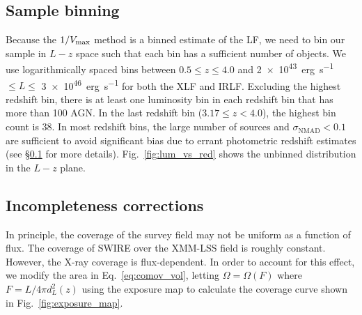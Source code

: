 \documentclass[twocolumn, trackchanges]{aastex63}
\begin{document}
\subsection{Sample binning}
\label{sec:binning}

Because the $1/V_{\rm max}$ method is a binned estimate of the LF, we need to bin our sample in $L-z$ space such that each bin has a sufficient number of objects.
We use logarithmically spaced bins between $0.5 \leq z \leq 4.0$ and \SI{2e43}{erg~s^{-1}} $\leq L \leq$ \SI{3e46}{erg~s^{-1}} for both the XLF and IRLF.
Excluding the highest redshift bin, there is at least one luminosity bin in each redshift bin that has more than 100 AGN.
In the last redshift bin ($3.17\leq z <4.0$), the highest bin count is 38.
In most redshift bins, the large number of sources and $\sigma_\mathrm{NMAD} < 0.1$ are sufficient to avoid significant bias due to errant photometric redshift estimates (see \S\ref{sec:binning} for more details).
Fig.~\ref{fig:lum_vs_red} shows the unbinned distribution in the $L-z$ plane.


\subsection{Incompleteness corrections}
\label{sec:inc_corr}

\begin{figure*}[hptb]
\centering
\caption{\textit{Left panel:} Exposure map of \textit{XMM-Newton} over the XMM-LSS field. The blue box is the region used to generate the XMM-SERVS catalog.  X-ray coverage as a function of flux for XMM-SERVS catalog. Note that the coverage is uncorrected for Eddington bias.}
\label{fig:exposure_map}
\end{figure*}

In principle, the coverage of the survey field may not be uniform as a function of flux.
The coverage of SWIRE over the XMM-LSS field is roughly constant.
However, the X-ray coverage is flux-dependent. 
In order to account for this effect, we modify the area in Eq.~\ref{eq:comov_vol}, letting $\Omega=\Omega(F)$ where $F = L/4\pi d_L^2(z)$ using the exposure map to calculate the coverage curve shown in Fig.~\ref{fig:exposure_map}. 
\end{document}

